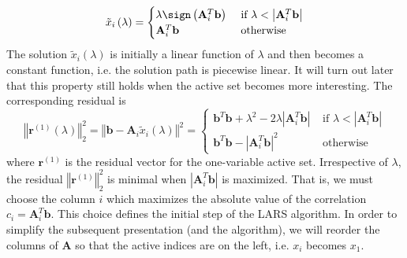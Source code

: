 \begin{equation}
\tilde{x}_{i}\left(\lambda\right)=\begin{cases}
\lambda\sign\left(\mathbf{A}_{i}^{T}\mathbf{b}\right) & \mbox{ if }\lambda<\left|\mathbf{A}_{i}^{T}\mathbf{b}\right|\\
\mathbf{A}_{i}^{T}\mathbf{b} & \mbox{ otherwise}
\end{cases}\label{eq:one-variable-solution}
\end{equation}
The solution $\tilde{x}_{i}\left(\lambda\right)$ is initially a linear
function of $\lambda$ and then becomes a constant function, i.e.
the solution path is piecewise linear. It will turn out later that
this property still holds when the active set becomes more interesting.
The corresponding residual is
\begin{equation}
\left\Vert \mathbf{r}^{(1)}\left(\lambda\right)\right\Vert _{2}^{2}=\left\Vert \mathbf{b}-\mathbf{A}_{i}\tilde{x}_{i}\left(\lambda\right)\right\Vert ^{2}=\begin{cases}
\mathbf{b}^{T}\mathbf{b}+\lambda^{2}-2\lambda\left|\mathbf{A}_{i}^{T}\mathbf{b}\right| & \mbox{ if }\lambda<\left|\mathbf{A}_{i}^{T}\mathbf{b}\right|\\
\mathbf{b}^{T}\mathbf{b}-\left|\mathbf{A}_{i}^{T}\mathbf{b}\right|^{2} & \mbox{ otherwise}
\end{cases}
\end{equation}
where $\mathbf{r}^{(1)}$ is the residual vector for the one-variable
active set. Irrespective of $\lambda$, the residual $\left\Vert \mathbf{r}^{(1)}\right\Vert _{2}^{2}$
is minimal when $\left|\mathbf{A}_{i}^{T}\mathbf{b}\right|$ is maximized.
That is, we must choose the column $i$ which maximizes the absolute
value of the correlation $c_{i}=\mathbf{A}_{i}^{T}\mathbf{b}$. This
choice defines the initial step of the LARS algorithm. In order to
simplify the subsequent presentation (and the algorithm), we will
reorder the columns of $\mathbf{A}$ so that the active indices are
on the left, i.e. $x_{i}$ becomes $x_{1}$.


